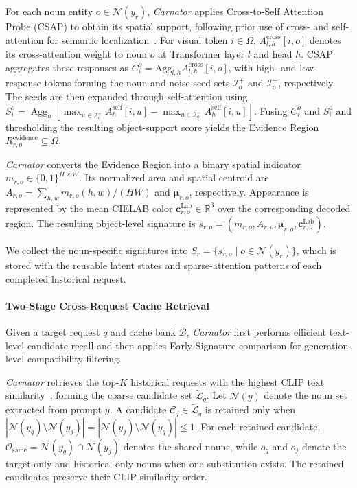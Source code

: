 For each noun entity $o\in\mathcal{N}(y_r)$, \emph{Carnator} applies Cross-to-Self Attention Probe (CSAP) to obtain its spatial support, following prior use of cross- and self-attention for semantic localization~\citep{liu2024towards,qi2023fatezero}.
For visual token $i\in\Omega$, $A^{\mathrm{cross}}_{l,h}[i,o]$ denotes its cross-attention weight to noun $o$ at Transformer layer $l$ and head $h$.
CSAP aggregates these responses as
$C_i^o=\mathrm{Agg}_{l,h}A^{\mathrm{cross}}_{l,h}[i,o]$,
with high- and low-response tokens forming the noun and noise seed sets $\mathcal{I}_o^{+}$ and $\mathcal{I}_o^{-}$, respectively.
The seeds are then expanded through self-attention using
$
S_i^o=
\operatorname{Agg}_{h}
\left[
\max_{u\in\mathcal I_o^{+}}A_h^{\mathrm{self}}[i,u]
-
\max_{u\in\mathcal I_o^{-}}A_h^{\mathrm{self}}[i,u]
\right].
$
Fusing $C_i^o$ and $S_i^o$ and thresholding the resulting object-support score yields the Evidence Region
$R_{r,o}^{\mathrm{evidence}}\subseteq\Omega$.

\emph{Carnator} converts the Evidence Region into a binary spatial indicator
$m_{r,o}\in\{0,1\}^{H\times W}$.
Its normalized area and spatial centroid are
$A_{r,o}=\sum_{h,w}m_{r,o}(h,w)/(HW)$
and $\boldsymbol{\mu}_{r,o}$, respectively.
Appearance is represented by the mean CIELAB color
$\mathbf{c}_{r,o}^{\mathrm{Lab}}\in\mathbb{R}^3$
over the corresponding decoded region.
The resulting object-level signature is
$
s_{r,o}
=
(m_{r,o},A_{r,o},\boldsymbol{\mu}_{r,o},\mathbf{c}_{r,o}^{\mathrm{Lab}}).
$

We collect the noun-specific signatures into
$S_r=\{s_{r,o}\mid o\in\mathcal{N}(y_r)\}$,
which is stored with the reusable latent states and sparse-attention patterns of each completed historical request.

\paragraph{Two-Stage Cross-Request Cache Retrieval}
Given a target request $q$ and cache bank $\mathcal{B}$, \emph{Carnator} first performs efficient text-level candidate recall and then applies Early-Signature comparison for generation-level compatibility filtering.

\emph{Carnator} retrieves the top-$K$ historical requests with the highest CLIP text similarity~\cite{radford2021learning}, forming the coarse candidate set $\widetilde{\mathcal{L}}_q$.
Let $\mathcal{N}(y)$ denote the noun set extracted from prompt $y$.
A candidate $\mathcal{C}_j\in\widetilde{\mathcal{L}}_q$ is retained only when
$
|\mathcal{N}(y_q)\setminus\mathcal{N}(y_j)|
=
|\mathcal{N}(y_j)\setminus\mathcal{N}(y_q)|
\leq1.
$
For each retained candidate,
$\mathcal{O}_{\mathrm{same}}=\mathcal{N}(y_q)\cap\mathcal{N}(y_j)$
denotes the shared nouns, while $o_q$ and $o_j$ denote the target-only and historical-only nouns when one substitution exists.
The retained candidates preserve their CLIP-similarity order.

